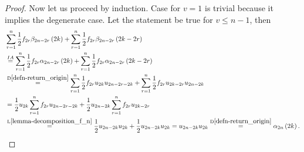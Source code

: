 \begin{proof}
 Now let us proceed by induction. Case for $v=1$ is trivial because it implies the degenerate case. Let the statement be true for $v \leq n-1$, then
 \[
  \begin{split}
    & \suma[r][1][n] \h f_{2r} \beta_{2n-2r}\left(2k\right)+\suma[r][1][n] \h f_{2r}\beta_{2n-2r}\left(2k-2r\right)\\
    & \induk \suma[r][1][n] \h f_{2r} \alpha_{2n-2r}\left(2k\right)+\suma[r][1][n] \h f_{2r}\alpha_{2n-2r}\left(2k-2r\right)\\
    & \overset{\text{D}\ref{defn-return_origin}}{=} \suma[r][1][n] \h f_{2r} u_{2k}u_{2n-2r-2k}+\suma[r][1][n] \h f_{2r} u_{2k-2r}u_{2n-2k}\\
    & = \h u_{2k} \suma[r][1][n] f_{2r} u_{2n-2r-2k}+ \h u_{2n-2k} \suma[r][1][n] f_{2r} u_{2k-2r}\\
    & \overset{\text{L}\ref{lemma-decomposition_f_n}}{=} \h u_{2n-2k} u_{2k} +\h u_{2n-2k} u_{2k}=u_{2n-2k} u_{2k}
   \overset{\text{D}\ref{defn-return_origin}}{=}\alpha_{2n}\left(2k\right).
  \end{split}
 \]
\end{proof}
\begin{comment}
\begin{defn}[Change of a sign]
 \Lrw. We say that \intime $n$ occurred a change of sign if if $S_{n-1}\cdot S_{n+1}=-1$ in other words if $\left(S_{n-1}=+1 \land S_{n+1}=-1\right) \lor \left(S_{n-1}=-1 \land S_{n+1}=+1\right).$
 We shall denote the probability that up to \Time $n$ occurred $r$ changes of sign by $\xi_{r, n}$.
\end{defn}
\begin{thm}[Change of a sign]
 \Lrws. The probability $\xi_{r,2n+1}=2\pr\left( S_{2n+1}=2r+1 \right)$
\end{thm}
\begin{proof}
 Feller
\end{proof}
\end{comment}
